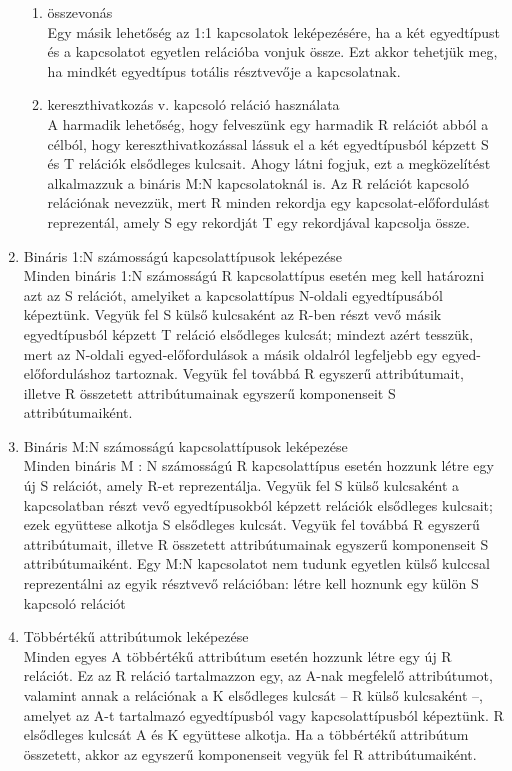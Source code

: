 \begin{enumerate}[nosep]
\begin{enumerate}
		\item összevonás\\
		{\footnotesize Egy másik lehetőség az 1:1 kapcsolatok leképezésére, ha a két egyedtípust és a kapcsolatot egyetlen relációba vonjuk össze. Ezt akkor tehetjük meg, ha mindkét egyedtípus totális résztvevője a kapcsolatnak.}
		\item kereszthivatkozás v. kapcsoló reláció használata\\
		{\footnotesize A harmadik lehetőség, hogy felveszünk egy harmadik R relációt abból a célból, hogy kereszthivatkozással lássuk el a két egyedtípusból képzett S és T relációk elsődleges kulcsait. Ahogy látni fogjuk, ezt a megközelítést alkalmazzuk a bináris M:N kapcsolatoknál is. Az R relációt kapcsoló relációnak nevezzük, mert R minden rekordja egy kapcsolat-előfordulást reprezentál, amely S egy rekordját T egy rekordjával kapcsolja össze.}
	\end{enumerate}
	\item Bináris 1:N számosságú kapcsolattípusok leképezése\\
	{\footnotesize Minden bináris 1:N számosságú R kapcsolattípus esetén meg kell határozni azt az S relációt, amelyiket a kapcsolattípus N-oldali egyedtípusából képeztünk. Vegyük fel S külső kulcsaként az R-ben részt vevő másik egyedtípusból képzett T reláció elsődleges kulcsát; mindezt azért tesszük, mert az N-oldali egyed-előfordulások a másik oldalról legfeljebb egy egyed-előforduláshoz tartoznak. Vegyük fel továbbá R egyszerű attribútumait, illetve R összetett attribútumainak egyszerű komponenseit S attribútumaiként.}
	\item Bináris M:N számosságú kapcsolattípusok leképezése\\
	{\footnotesize Minden bináris M : N számosságú R kapcsolattípus esetén hozzunk létre egy új S relációt, amely R-et reprezentálja. Vegyük fel S külső kulcsaként a kapcsolatban részt vevő egyedtípusokból képzett relációk elsődleges kulcsait; ezek együttese alkotja S elsődleges kulcsát. Vegyük fel továbbá R egyszerű attribútumait, illetve R összetett attribútumainak egyszerű komponenseit S attribútumaiként. Egy M:N kapcsolatot nem tudunk egyetlen külső kulccsal reprezentálni az egyik résztvevő relációban: létre kell hoznunk egy külön S kapcsoló relációt}
	\item Többértékű attribútumok leképezése\\
	{\footnotesize Minden egyes A többértékű attribútum esetén hozzunk létre egy új R relációt. Ez az R reláció tartalmazzon egy, az A-nak megfelelő attribútumot, valamint annak a relációnak a K elsődleges kulcsát – R külső kulcsaként –, amelyet az A-t tartalmazó egyedtípusból vagy kapcsolattípusból képeztünk. R elsődleges kulcsát A és K együttese alkotja. Ha a többértékű attribútum összetett, akkor az egyszerű komponenseit vegyük fel R attribútumaiként.}

\end{enumerate}
